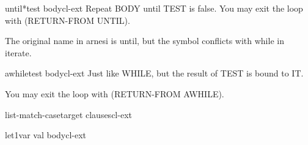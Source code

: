 \begin{macro}{until*}{test \body body}{cl-ext}{}
  Repeat BODY until TEST is false. You may exit the loop with
  (RETURN-FROM UNTIL).
  \begin{devnote}
    The original name in arnesi is until, but the symbol conflicts
    with while in iterate.
  \end{devnote}
\end{macro}

\begin{macro}{awhile}{test \body body}{cl-ext}{}
  Just like WHILE, but the result of TEST is bound to IT.

You may exit the loop with (RETURN-FROM AWHILE).
\end{macro}

\begin{macro}{list-match-case}{target \body clauses}{cl-ext}{}
  
\end{macro}

\begin{macro}{let1}{var val \body body}{cl-ext}{}
  
\end{macro}

